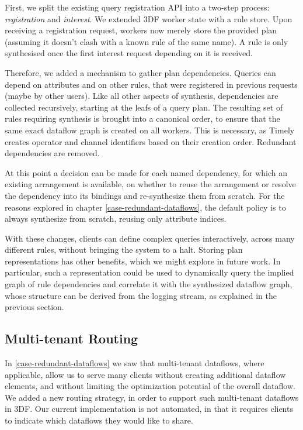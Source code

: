 \documentclass[../index.tex]{subfiles}
\begin{document}
First, we split the existing query registration API into a two-step
process: \emph{registration} and \emph{interest}. We extended 3DF
worker state with a rule store. Upon receiving a registration request,
workers now merely store the provided plan (assuming it doesn't clash
with a known rule of the same name). A rule is only synthesised once
the first interest request depending on it is received.

Therefore, we added a mechanism to gather plan dependencies. Queries
can depend on attributes and on other rules, that were registered in
previous requests (maybe by other users). Like all other aspects of
synthesis, dependencies are collected recursively, starting at the
leafs of a query plan. The resulting set of rules requiring synthesis
is brought into a canonical order, to ensure that the same exact
dataflow graph is created on all workers. This is necessary, as Timely
creates operator and channel identifiers based on their creation
order. Redundant dependencies are removed.

At this point a decision can be made for each named dependency, for
which an existing arrangement is available, on whether to reuse the
arrangement or resolve the dependency into its bindings and
re-synthesize them from scratch. For the reasons explored in chapter
\ref{case-redundant-dataflows}, the default policy is to always
synthesize from scratch, reusing only attribute indices.

With these changes, clients can define complex queries interactively,
across many different rules, without bringing the system to a
halt. Storing plan representations has other benefits, which we might
explore in future work. In particular, such a representation could be
used to dynamically query the implied graph of rule dependencies and
correlate it with the synthesized dataflow graph, whose structure can
be derived from the logging stream, as explained in the previous
section.

\subsection{Multi-tenant Routing}

In \autoref{case-redundant-dataflows} we saw that multi-tenant
dataflows, where applicable, allow us to serve many clients without
creating additional dataflow elements, and without limiting the
optimization potential of the overall dataflow. We added a new routing
strategy, in order to support such multi-tenant dataflows in 3DF. Our
current implementation is not automated, in that it requires clients
to indicate which dataflows they would like to share.
\end{document}
